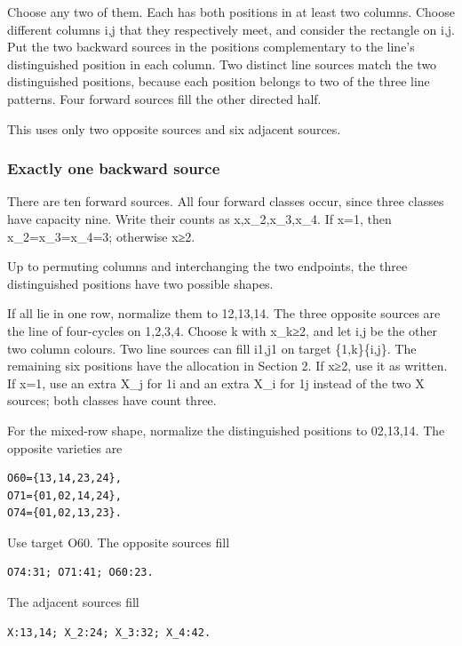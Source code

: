 \documentclass[
  10pt,
]{article}
\begin{document}
Choose any two of them. Each has both positions in at least two columns.
Choose different columns i,j that they respectively meet, and consider
the rectangle on i,j. Put the two backward sources in the positions
complementary to the line's distinguished position in each column. Two
distinct line sources match the two distinguished positions, because
each position belongs to two of the three line patterns. Four forward
sources fill the other directed half.

This uses only two opposite sources and six adjacent sources.

\hypertarget{exactly-one-backward-source}{%
\subsubsection*{Exactly one backward
source}\label{exactly-one-backward-source}}

There are ten forward sources. All four forward classes occur, since
three classes have capacity nine. Write their counts as
x,x\_2,x\_3,x\_4. If x=1, then x\_2=x\_3=x\_4=3; otherwise x≥2.

Up to permuting columns and interchanging the two endpoints, the three
distinguished positions have two possible shapes.

If all lie in one row, normalize them to 12,13,14. The three opposite
sources are the line of four-cycles on 1,2,3,4. Choose k with x\_k≥2,
and let i,j be the other two column colours. Two line sources can fill
i1,j1 on target \{1,k\}\textbar\{i,j\}. The remaining six positions have
the allocation in Section 2. If x≥2, use it as written. If x=1, use an
extra X\_j for 1i and an extra X\_i for 1j instead of the two X sources;
both classes have count three.

For the mixed-row shape, normalize the distinguished positions to
02,13,14. The opposite varieties are

\begin{verbatim}
O60={13,14,23,24},
O71={01,02,14,24},
O74={01,02,13,23}.
\end{verbatim}

Use target O60. The opposite sources fill

\begin{verbatim}
O74:31; O71:41; O60:23.
\end{verbatim}

The adjacent sources fill

\begin{verbatim}
X:13,14; X_2:24; X_3:32; X_4:42.
\end{verbatim}
\end{document}
